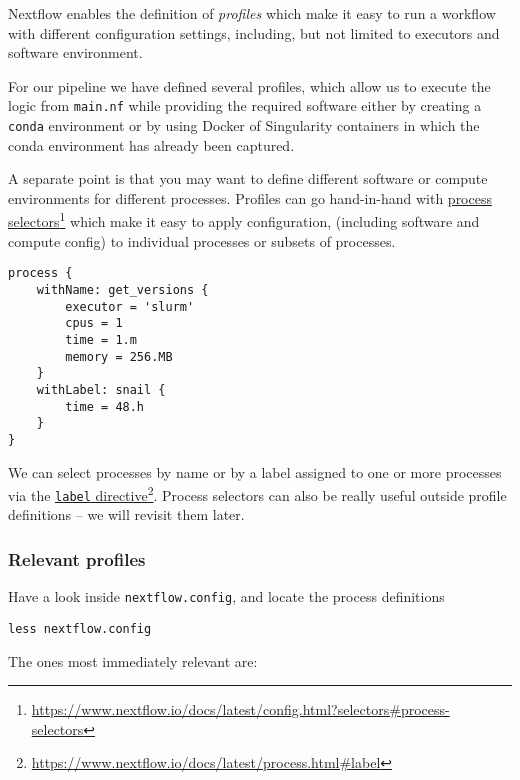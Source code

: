 Nextflow enables the definition of \emph{profiles} which make it easy to run a workflow 
with different configuration settings, including, but not limited to executors and software environment.

For our pipeline we have defined several profiles, which allow us to execute the logic from \texttt{main.nf} while providing the required software either by creating a \texttt{conda} environment or by using Docker of Singularity containers in which the conda environment has already been captured. 

\begin{note} 
A separate point is that you may  want to define different software or compute environments for different processes. 
Profiles can go hand-in-hand with \href{https://www.nextflow.io/docs/latest/config.html?selectors#process-selectors}{process selectors}\footnote{\url{https://www.nextflow.io/docs/latest/config.html?selectors\#process-selectors}} which make it easy to apply configuration, (including software and compute config) to individual processes or subsets of processes.
\begin{lstlisting}
process {
    withName: get_versions {
        executor = 'slurm'
        cpus = 1
        time = 1.m
        memory = 256.MB        
    }
    withLabel: snail {
        time = 48.h 
    }
}
\end{lstlisting}
\end{note}

We can select processes by name or by a label assigned to one or more processes via the \href{https://www.nextflow.io/docs/latest/process.html#label}{\texttt{label} directive}\footnote{\url{https://www.nextflow.io/docs/latest/process.html\#label}}.
Process selectors can also be really useful outside profile definitions -- we will revisit them later.

\subsubsection{Relevant profiles}


Have a look inside \texttt{nextflow.config}, and locate the process definitions

\begin{steps}
\begin{lstlisting}
less nextflow.config
\end{lstlisting}
\end{steps}

The ones most immediately relevant are:

